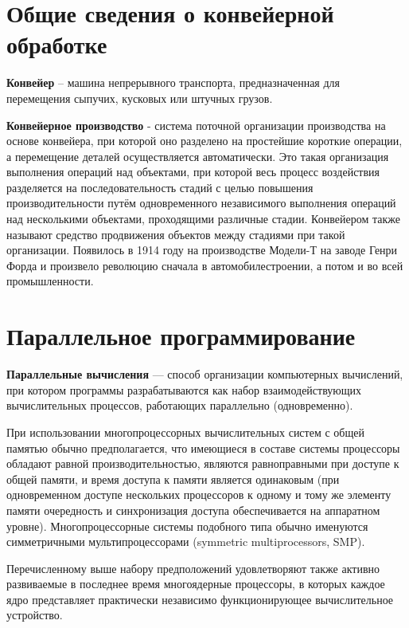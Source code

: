 \documentclass[12pt]{report}
\begin{document}
\section{Общие сведения о конвейерной обработке}

\parindent=1cm

	\textbf{Конвейер} – машина непрерывного транспорта, предназначенная для перемещения сыпучих, кусковых или штучных грузов.\cite{mednov}
\parindent=1cm

	\textbf{Конвейерное производство} - система поточной организации производства на основе конвейера, при которой оно разделено на простейшие короткие операции, а перемещение деталей осуществляется автоматически. Это такая организация выполнения операций над объектами, при которой весь процесс воздействия разделяется на последовательность стадий с целью повышения производительности путём одновременного независимого выполнения операций над несколькими объектами, проходящими различные стадии. Конвейером также называют средство продвижения объектов между стадиями при такой организации.\cite{wiki} Появилось в 1914 году на производстве Модели-Т на заводе Генри Форда и произвело революцию сначала в автомобилестроении, а потом и во всей промышленности.\cite{ford}

\section{Параллельное программирование}
	\textbf{Параллельные вычисления} — способ организации компьютерных вычислений, при котором программы разрабатываются как набор взаимодействующих вычислительных процессов, работающих параллельно (одновременно). 

При использовании многопроцессорных вычислительных систем с общей памятью обычно предполагается, что имеющиеся в составе системы процессоры обладают равной производительностью, являются равноправными при доступе к общей памяти, и время доступа к памяти является одинаковым (при одновременном доступе нескольких процессоров к одному и тому же элементу памяти очередность и синхронизация доступа обеспечивается на аппаратном уровне). Многопроцессорные системы подобного типа обычно именуются симметричными мультипроцессорами (symmetric multiprocessors, SMP).

Перечисленному выше набору предположений удовлетворяют также активно развиваемые в последнее время многоядерные процессоры, в которых каждое ядро представляет практически независимо функционирующее вычислительное устройство.
\end{document}
